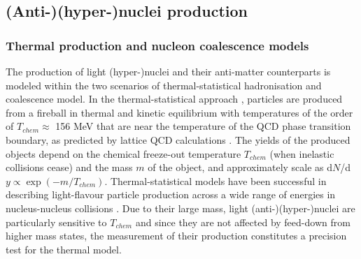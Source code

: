 \subsection{(Anti-)(hyper-)nuclei production} 
\subsubsection{Thermal production and nucleon coalescence models}
\label{sec:producionmodels}

The production of light (hyper-)nuclei and their anti-matter counterparts is modeled within the two scenarios of thermal-statistical hadronisation and coalescence model.
In the thermal-statistical approach \cite{Andronic:2010qu, Andronic:2017}, particles are produced from a fireball in thermal and kinetic equilibrium with temperatures of the order of $T_{chem} \approx$ 156 MeV that are near the temperature of the QCD phase transition boundary, as predicted by lattice QCD calculations \cite{Bazavov:2014pvz,Bellwied:2013cta}.
The yields of the produced objects depend on the chemical freeze-out temperature $T_{chem}$ (when inelastic collisions cease) and the mass $m$ of the object, and approximately scale as d$N$/d$y \propto \exp(-m/T_{chem})$.  
Thermal-statistical models have been successful in describing light-flavour particle production across a wide range of energies in nucleus-nucleus collisions \cite{Andronic:2017, Acharya:2017bso}.  
Due to their large mass, light (anti-)(hyper-)nuclei are particularly sensitive to $T_{chem}$ and since they are not affected by feed-down from higher mass states, the measurement of their production constitutes a precision test for the thermal model.  


